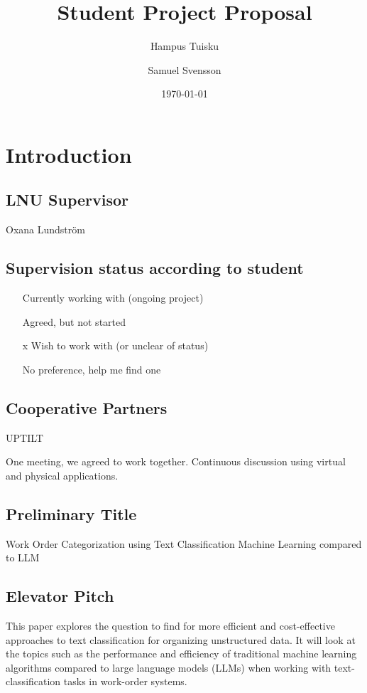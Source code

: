 \documentclass{article}
\title{Student Project Proposal}
\author{Hampus Tuisku \and Samuel Svensson}
\date{\today}
\begin{document}
\maketitle

\section{Introduction}

\subsection{LNU Supervisor}
Oxana Lundström

\subsection{Supervision status according to student}

\begin{itemize}
      \item [ ] Currently working with (ongoing project)
      \item [ ] Agreed, but not started
      \item [x] Wish to work with (or unclear of status)
      \item [ ] No preference, help me find one
\end{itemize}

\subsection{Cooperative Partners}

UPTILT

One meeting, we agreed to work together.
Continuous discussion using virtual and physical applications.

\subsection{Preliminary Title}

Work Order Categorization using Text Classification Machine Learning compared to LLM

\subsection{Elevator Pitch}
This paper explores the question to find for more efficient and cost-effective approaches to text classification for
organizing unstructured data. It will look at the topics such as the performance and efficiency of traditional
machine learning algorithms compared to large language models (LLMs) when working with text-classification tasks in work-order systems.
\end{document}
